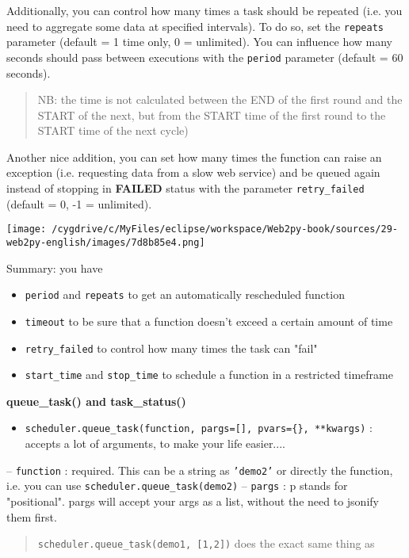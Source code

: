 \documentclass[justified,sixbynine,notoc]{tufte-book}
\def\ft{\small\tt}
\begin{document}
\begin{fullwidth}
Additionally, you can control how many times a task should be repeated (i.e. you need to aggregate some data at specified intervals). To do so, set the {\ft repeats}
parameter (default = 1 time only, 0 = unlimited). You can influence how many seconds should pass between executions with the {\ft period} parameter (default = 60 seconds).

\begin{quote}NB: the time is not calculated between the END of the first round and the START of the next, but from the START time of the first round to the START time of the next cycle)\end{quote}
Another nice addition, you can set how many times the function can raise an exception (i.e. requesting data from a slow web service) and be queued again instead of stopping in {\bf FAILED}  status with the parameter {\ft retry\_failed} (default = 0, -1 = unlimited).


\goodbreak\begin{center}\texttt{[image: /cygdrive/c/MyFiles/eclipse/workspace/Web2py-book/sources/29-web2py-english/images/7d8b85e4.png]}\end{center}


Summary: you have
\begin{itemize}
\item {\ft period} and {\ft repeats} to get an automatically rescheduled function

\item {\ft timeout} to be sure that a function doesn't exceed a certain amount of time

\item {\ft retry\_failed} to control how many times the task can "fail"

\item {\ft start\_time} and {\ft stop\_time} to schedule a function in a restricted timeframe
\end{itemize}

{\bf queue\_task() and task\_status()}

\begin{itemize}
\item {\ft scheduler.queue\_task(function, pargs=[], pvars=\{\}, **kwargs)} : accepts a lot of arguments, to make your life easier....
\end{itemize}
-- {\ft function} : required. This can be a string as {\ft 'demo2'} or directly the function, i.e. you can use {\ft scheduler.queue\_task(demo2)}
-- {\ft pargs} : p stands for "positional". pargs will accept your args as a list, without the need to jsonify them first.
\begin{quote}{\ft scheduler.queue\_task(demo1, [1,2])}
\noindent does the exact same thing as


\end{quote}
\end{fullwidth}
\end{document}
